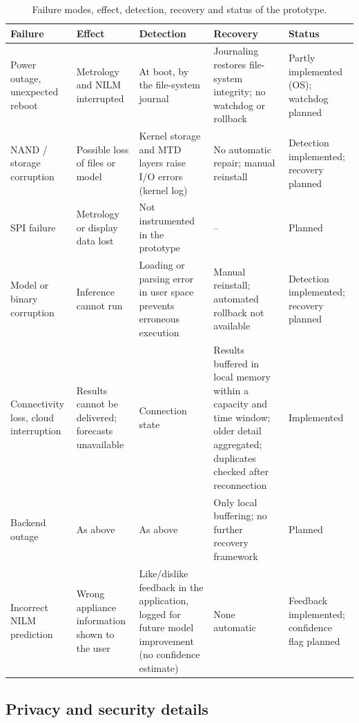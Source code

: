 \begin{table}[H]
\centering
\caption{Failure modes, effect, detection, recovery and status of the prototype.}
\label{tab:failures}
\footnotesize
\begin{tabular}{@{}p{2.6cm}p{3.2cm}p{3.6cm}p{4.2cm}p{1.8cm}@{}}
\toprule
Failure & Effect & Detection & Recovery & Status \\
\midrule
Power outage, unexpected reboot & Metrology and NILM interrupted & At boot, by the file-system journal & Journaling restores file-system integrity; no watchdog or rollback & Partly implemented (OS); watchdog planned \\
NAND / storage corruption & Possible loss of files or model & Kernel storage and MTD layers raise I/O errors (kernel log) & No automatic repair; manual reinstall & Detection implemented; recovery planned \\
SPI failure & Metrology or display data lost & Not instrumented in the prototype & -- & Planned \\
Model or binary corruption & Inference cannot run & Loading or parsing error in user space prevents erroneous execution & Manual reinstall; automated rollback not available & Detection implemented; recovery planned \\
Connectivity loss, cloud interruption & Results cannot be delivered; forecasts unavailable & Connection state & Results buffered in local memory within a capacity and time window; older detail aggregated; duplicates checked after reconnection & Implemented \\
Backend outage & As above & As above & Only local buffering; no further recovery framework & Planned \\
Incorrect NILM prediction & Wrong appliance information shown to the user & Like/dislike feedback in the application, logged for future model improvement (no confidence estimate) & None automatic & Feedback implemented; confidence flag planned \\
\bottomrule
\end{tabular}
\end{table}




\subsection*{Privacy and security details}

